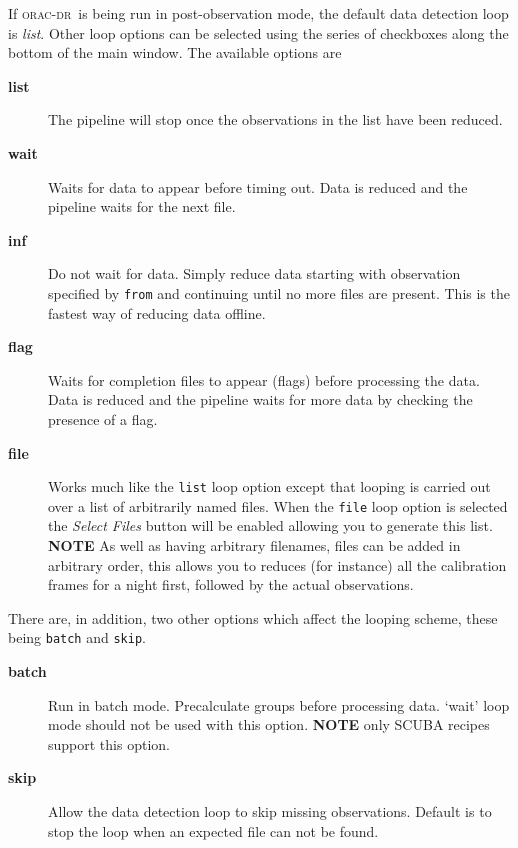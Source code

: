 \documentclass[twoside,11pt]{article}
\renewcommand{\_}{\texttt{\symbol{95}}}
\newcommand{\oracdr}{\textsc{orac-dr}}
\begin{document}
If \oracdr\ is being run in post-observation mode, the default data
detection loop is \textit{list}. Other loop options can be selected using
the series of checkboxes along the bottom of the main window. The
available options are

\begin{description}
\item[\textbf{list}] \mbox{}

The pipeline will stop once the observations in the list have been
reduced.

\item[\textbf{wait}] \mbox{}

Waits for data to appear before timing out. Data is reduced and the
pipeline waits for the next file.

\item[\textbf{inf}] \mbox{}

Do not wait for data. Simply reduce data starting with observation
specified by \texttt{from} and continuing until no more files are present.
This is the fastest way of reducing data offline.

\item[\textbf{flag}] \mbox{}

Waits for completion files to appear (flags) before processing the
data.  Data is reduced and the pipeline waits for more data by
checking the presence of a flag.

\item[\textbf{file}] \mbox{}

Works much like the \texttt{list} loop option except that looping is carried
out over a list of arbitrarily named files. When the \texttt{file} loop option
is selected the \textit{Select Files} button will be enabled allowing you to
generate this list. \textbf{NOTE} As well as having arbitrary filenames,
files can be added in arbitrary order, this allows you to reduces (for
instance) all the calibration frames for a night first, followed by
the actual observations.

\end{description}


There are, in addition, two other options which affect the looping
scheme, these being \texttt{batch} and \texttt{skip}.

\begin{description}
\item[\textbf{batch}] \mbox{}

Run in batch mode. Precalculate groups before processing data. `wait'
loop mode should not be used with this option.  \textbf{NOTE} only SCUBA
recipes support this option.

\item[\textbf{skip}] \mbox{}

Allow the data detection loop to skip missing observations. Default is
to stop the loop when an expected file can not be found.

\end{description}
\end{document}
